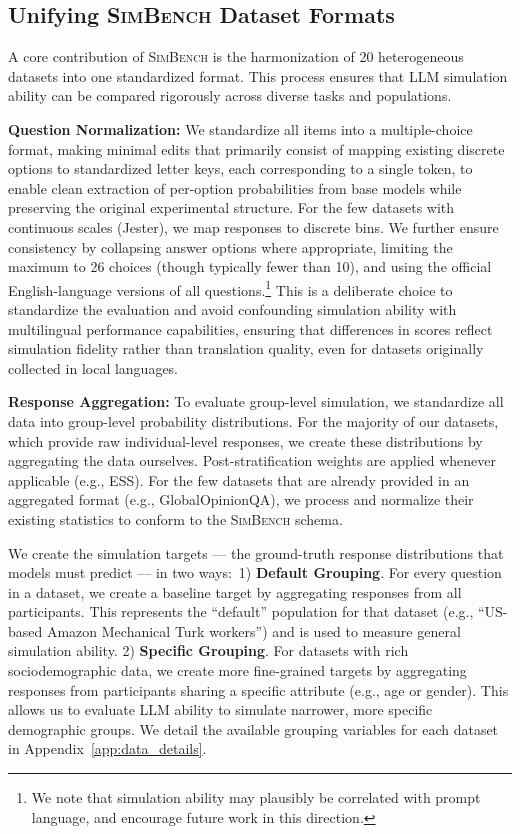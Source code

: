 \documentclass{article} %
\begin{document}
\subsection{Unifying \textsc{SimBench} Dataset Formats}
\label{subsec: simbench - preprocessing}
A core contribution of \textsc{SimBench} is the harmonization of 20 heterogeneous datasets into one standardized format. This process ensures that LLM simulation ability can be compared rigorously across diverse tasks and populations.

\textbf{Question Normalization:} We standardize all items into a multiple-choice format, making minimal edits that primarily consist of mapping existing discrete options to standardized letter keys, each corresponding to a single token, to enable clean extraction of per-option probabilities from base models while preserving the original experimental structure. For the few datasets with continuous scales (Jester), we map responses to discrete bins. We further ensure consistency by collapsing answer options where appropriate, limiting the maximum to 26 choices (though typically fewer than 10), and using the official English-language versions of all questions.\footnote{We note that simulation ability may plausibly be correlated with prompt language, and encourage future work in this direction.} This is a deliberate choice to standardize the evaluation and avoid confounding simulation ability with multilingual performance capabilities, ensuring that differences in scores reflect simulation fidelity rather than translation quality, even for datasets originally collected in local languages.

\textbf{Response Aggregation:} To evaluate group-level simulation, we standardize all data into group-level probability distributions. For the majority of our datasets, which provide raw individual-level responses, we create these distributions by aggregating the data ourselves. Post-stratification weights are applied whenever applicable (e.g., ESS). For the few datasets that are already provided in an aggregated format (e.g., GlobalOpinionQA), we process and normalize their existing statistics to conform to the \textsc{SimBench} schema. 

We create the simulation targets — the ground-truth response distributions that models must predict — in two ways:\ 1) \textbf{Default Grouping}. For every question in a dataset, we create a baseline target by aggregating responses from all participants. This represents the ``default'' population for that dataset (e.g., ``US-based Amazon Mechanical Turk workers'') and is used to measure general simulation ability. 2) \textbf{Specific Grouping}. For datasets with rich sociodemographic data, we create more fine-grained targets by aggregating responses from participants sharing a specific attribute (e.g., age or gender). This allows us to evaluate LLM ability to simulate narrower, more specific demographic groups. We detail the available grouping variables for each dataset in Appendix~\ref{app:data_details}.
\end{document}
